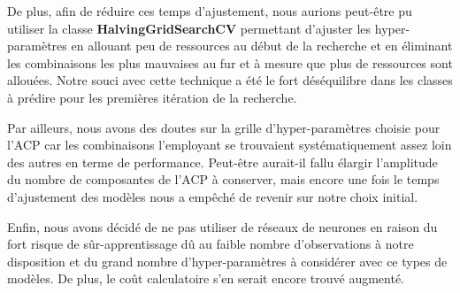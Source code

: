 \documentclass[11pt]{article}
\begin{document}
  De plus, afin de réduire ces temps d'ajustement, nous aurions peut-être pu utiliser la classe \textbf{HalvingGridSearchCV} permettant d'ajuster les hyper-paramètres en allouant peu de ressources au début de la recherche et en éliminant les combinaisons les plus mauvaises au fur et à mesure que plus de ressources sont allouées.
  Notre souci avec cette technique a été le fort déséquilibre dans les classes à prédire pour les premières itération de la recherche.

  Par ailleurs, nous avons des doutes sur la grille d'hyper-paramètres choisie pour l'ACP car les combinaisons l'employant se trouvaient systématiquement assez loin des autres en terme de performance.
  Peut-être aurait-il fallu élargir l'amplitude du nombre de composantes de l'ACP à conserver, mais encore une fois le temps d'ajustement des modèles nous a empêché de revenir sur notre choix initial.

  Enfin, nous avons décidé de ne pas utiliser de réseaux de neurones en raison du fort risque de sûr-apprentissage dû au faible nombre d'observations à notre disposition et du grand nombre d'hyper-paramètres à considérer avec ce types de modèles.
  De plus, le coût calculatoire s'en serait encore trouvé augmenté.
\end{document}
